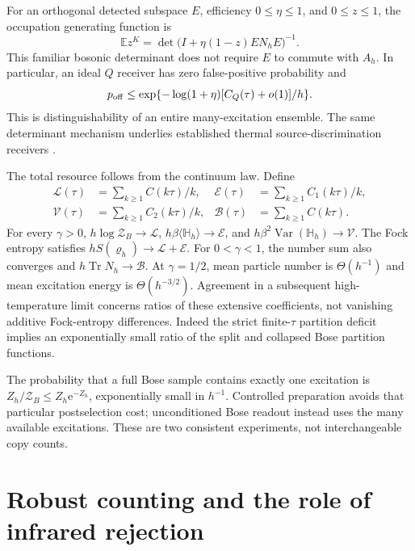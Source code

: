 \documentclass[aps,pra,reprint,superscriptaddress,longbibliography]{revtex4-2}
\newcommand{\Tr}{\operatorname{Tr}}
\newcommand{\ee}{\mathrm e}
\begin{document}
For an orthogonal detected subspace $E$, efficiency $0\le\eta\le1$,
and $0\le z\le1$, the occupation generating function is
\begin{equation}
 \mathbb E z^K=\det\bigl(I+\eta(1-z)EN_hE\bigr)^{-1}.
 \label{sgt:main:PGF}
\end{equation}
This familiar bosonic determinant \cite{Klich2002,Quesada2018} does not require
$E$ to commute with $A_h$. In particular, an ideal $Q$ receiver has
zero false-positive probability and
\begin{equation}
 p_{\rm off}\le
 \exp\{-\log(1+\eta)[C_Q(\tau)+o(1)]/h\}.
 \label{sgt:main:off}
\end{equation}
This is distinguishability of an entire many-excitation ensemble.
The same determinant mechanism underlies established thermal
source-discrimination receivers \cite{Lu2018}.

The total resource follows from the continuum law. Define
\begin{align}
 \mathcal L(\tau)&=\sum_{k\ge1}C(k\tau)/k,&
 \mathcal E(\tau)&=\sum_{k\ge1}C_1(k\tau)/k,\nonumber\\
 \mathcal V(\tau)&=\sum_{k\ge1}C_2(k\tau)/k,&
 \mathcal B(\tau)&=\sum_{k\ge1}C(k\tau).
 \label{sgt:main:bosecoeff}
\end{align}
For every $\gamma>0$, $h\log\mathcal Z_B\to\mathcal L$,
$h\beta\langle\mathbb H_h\rangle\to\mathcal E$, and
$h\beta^2\operatorname{Var}(\mathbb H_h)\to\mathcal V$.
The Fock entropy satisfies $hS(\varrho_h)\to\mathcal L+\mathcal E$.
For $0<\gamma<1$, the number sum also converges and
$h\Tr N_h\to\mathcal B$. At $\gamma=1/2$, mean particle number is
$\Theta(h^{-1})$ and mean excitation energy is $\Theta(h^{-3/2})$.
Agreement in a subsequent high-temperature limit concerns ratios of
these extensive coefficients, not vanishing additive Fock-entropy
differences. Indeed the strict finite-$\tau$ partition deficit implies
an exponentially small ratio of the split and collapsed Bose partition
functions.

The probability that a full Bose sample contains exactly one excitation
is $Z_h/\mathcal Z_B\le Z_h\ee^{-Z_h}$, exponentially small in $h^{-1}$.
Controlled preparation avoids that particular postselection cost;
unconditioned Bose readout instead uses the many available excitations.
These are two consistent experiments, not interchangeable copy counts.

\section{Robust counting and the role of infrared rejection}
\label{sgt:main:robust}
\end{document}
